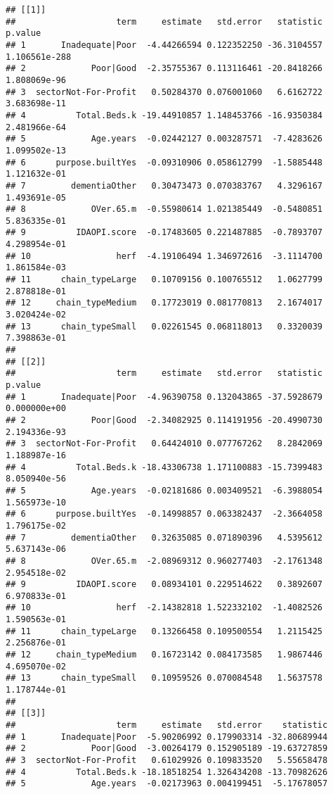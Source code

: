 \documentclass[]{article}
\begin{document}
\begin{verbatim}
## [[1]]
##                    term     estimate   std.error   statistic       p.value
## 1       Inadequate|Poor  -4.44266594 0.122352250 -36.3104557 1.106561e-288
## 2             Poor|Good  -2.35755367 0.113116461 -20.8418266  1.808069e-96
## 3  sectorNot-For-Profit   0.50284370 0.076001060   6.6162722  3.683698e-11
## 4          Total.Beds.k -19.44910857 1.148453766 -16.9350384  2.481966e-64
## 5             Age.years  -0.02442127 0.003287571  -7.4283626  1.099502e-13
## 6      purpose.builtYes  -0.09310906 0.058612799  -1.5885448  1.121632e-01
## 7         dementiaOther   0.30473473 0.070383767   4.3296167  1.493691e-05
## 8             OVer.65.m  -0.55980614 1.021385449  -0.5480851  5.836335e-01
## 9          IDAOPI.score  -0.17483605 0.221487885  -0.7893707  4.298954e-01
## 10                 herf  -4.19106494 1.346972616  -3.1114700  1.861584e-03
## 11      chain_typeLarge   0.10709156 0.100765512   1.0627799  2.878818e-01
## 12     chain_typeMedium   0.17723019 0.081770813   2.1674017  3.020424e-02
## 13      chain_typeSmall   0.02261545 0.068118013   0.3320039  7.398863e-01
## 
## [[2]]
##                    term     estimate   std.error   statistic      p.value
## 1       Inadequate|Poor  -4.96390758 0.132043865 -37.5928679 0.000000e+00
## 2             Poor|Good  -2.34082925 0.114191956 -20.4990730 2.194336e-93
## 3  sectorNot-For-Profit   0.64424010 0.077767262   8.2842069 1.188987e-16
## 4          Total.Beds.k -18.43306738 1.171100883 -15.7399483 8.050940e-56
## 5             Age.years  -0.02181686 0.003409521  -6.3988054 1.565973e-10
## 6      purpose.builtYes  -0.14998857 0.063382437  -2.3664058 1.796175e-02
## 7         dementiaOther   0.32635085 0.071890396   4.5395612 5.637143e-06
## 8             OVer.65.m  -2.08969312 0.960277403  -2.1761348 2.954518e-02
## 9          IDAOPI.score   0.08934101 0.229514622   0.3892607 6.970833e-01
## 10                 herf  -2.14382818 1.522332102  -1.4082526 1.590563e-01
## 11      chain_typeLarge   0.13266458 0.109500554   1.2115425 2.256876e-01
## 12     chain_typeMedium   0.16723142 0.084173585   1.9867446 4.695070e-02
## 13      chain_typeSmall   0.10959526 0.070084548   1.5637578 1.178744e-01
## 
## [[3]]
##                    term     estimate   std.error    statistic
## 1       Inadequate|Poor  -5.90206992 0.179903314 -32.80689944
## 2             Poor|Good  -3.00264179 0.152905189 -19.63727859
## 3  sectorNot-For-Profit   0.61029926 0.109833520   5.55658478
## 4          Total.Beds.k -18.18518254 1.326434208 -13.70982626
## 5             Age.years  -0.02173963 0.004199451  -5.17678057

\end{verbatim}
\end{document}
